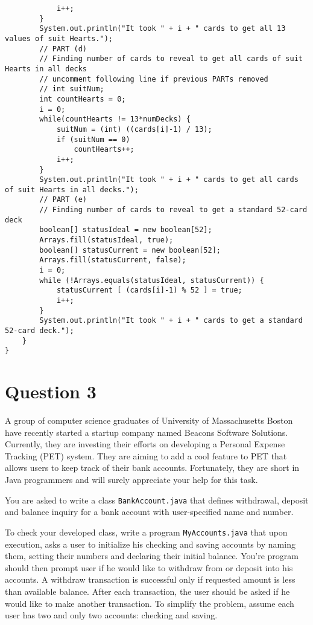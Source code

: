 \documentclass[12pt,letterpaper,twoside]{article}
\begin{document}
\begin{enumerate}
\begin{lstlisting}
			i++;
		}
		System.out.println("It took " + i + " cards to get all 13 values of suit Hearts.");
		// PART (d)
		// Finding number of cards to reveal to get all cards of suit Hearts in all decks
		// uncomment following line if previous PARTs removed
		// int suitNum;
		int countHearts = 0;
		i = 0;
		while(countHearts != 13*numDecks) {
			suitNum = (int) ((cards[i]-1) / 13);
			if (suitNum == 0)
				countHearts++;
			i++;
		}
		System.out.println("It took " + i + " cards to get all cards of suit Hearts in all decks.");
		// PART (e)
		// Finding number of cards to reveal to get a standard 52-card deck
		boolean[] statusIdeal = new boolean[52];
		Arrays.fill(statusIdeal, true);
		boolean[] statusCurrent = new boolean[52];
		Arrays.fill(statusCurrent, false);
		i = 0;
		while (!Arrays.equals(statusIdeal, statusCurrent)) {
			statusCurrent [ (cards[i]-1) % 52 ] = true;
			i++;
		}
		System.out.println("It took " + i + " cards to get a standard 52-card deck.");
	}
}
\end{lstlisting}
\end{enumerate}

\section*{Question 3}

A group of computer science graduates of University of Massachusetts Boston have recently started a startup company named Beacons Software Solutions.
Currently, they are investing their efforts on developing a Personal Expense Tracking (PET) system.
They are aiming to add a cool feature to PET that allows users to keep track of their bank accounts.
Fortunately, they are short in Java programmers and will surely appreciate your help for this task.

You are asked to write a class \texttt{BankAccount.java} that defines withdrawal, deposit and balance inquiry for a bank account with user-specified name and number.

To check your developed class, write a program \texttt{MyAccounts.java} that upon execution, asks a user to initialize his checking and saving accounts by naming them, setting their numbers and declaring their initial balance.
You're program should then prompt user if he would like to withdraw from or deposit into his accounts.
A withdraw transaction is successful only if requested amount is less than available balance.
After each transaction, the user should be asked if he would like to make another transaction.
To simplify the problem, assume each user has two and only two accounts: checking and saving.
\end{document}
